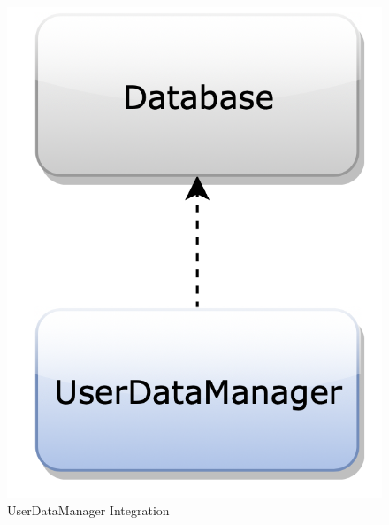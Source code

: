 \begin{figure}[H]
\begin{center}
        \begin{minipage}[c]{.40\textwidth}
	\centering
\includegraphics[scale=0.35]{Images/IntegrationPlanImages/fig5.png}
\caption{UserDataManager Integration}
        \end{minipage}%
        \hspace{10mm}%
        \begin{minipage}[c]{.40\textwidth}
	\centering

\end{minipage}
\end{center}
\end{figure}
